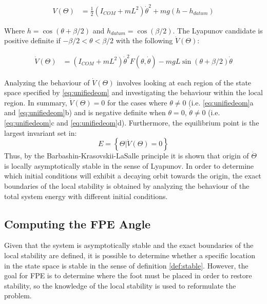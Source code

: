 \begin{equation}
	\begin{aligned}
		V(\Theta) &= {\frac{1}{2}({I_{COM}} + m{L^2}){\dot \theta ^2} + mg(h - {h_{datum}})}	
		\end{aligned}
\end{equation}

Where $h =\cos (\theta+\beta/2) $ and $h_{datum} = \cos (\beta/2)$. The Lyapunov candidate is positive definite if $-\beta/2 < \theta < \beta/2$ with the following $\dot{V}(\Theta)$: 

\begin{equation}
	\begin{aligned}
			\dot{V}(\Theta) &= ({I_{COM}} + m{L^2}){\dot \theta ^2}F(\theta ,\dot \theta ) - mgL\sin (\theta  + \beta /2)\dot \theta
	\end{aligned}
\end{equation}

Analyzing the behaviour of $\dot{V}(\Theta)$ involves looking at each region of the state space specified by \eqref{eq:unifiedeom} and investigating the behaviour within the local region. In summary, $\dot{V}(\Theta) = 0$ for the cases where $\theta \not= 0$  (i.e. \ref{eq:unifiedeom}a and \ref{eq:unifiedeom}b) and is negative definite when $\theta = 0$, $\dot{\theta} \not= 0$ (i.e. \ref{eq:unifiedeom}c and \ref{eq:unifiedeom}d). Furthermore, the equilibrium point is the largest invariant set in: 
\[E = \left\{ {\Theta |\dot V(\Theta ) = 0} \right\}\]
Thus, by the Barbashin-Krasovskii-LaSalle principle it is shown that origin of $\dot{\Theta}$ is locally asymptotically stable in the sense of Lyapunov. In order to determine which initial conditions will exhibit a decaying orbit towards the origin, the exact boundaries of the local stability is obtained by analyzing the behaviour of the total system energy with different initial conditions. 

\subsection{Computing the FPE Angle} %
\label{sub:computing_the_fpe_angle}
Given that the system is asymptotically stable and the exact boundaries of the local stability are defined, it is possible to determine whether a specific location in the state space is stable in the sense of definition \ref{def:stable}. However, the goal for FPE is to determine where the foot must be placed in order to restore stability, so the knowledge of the local stability is used to reformulate the problem. 

